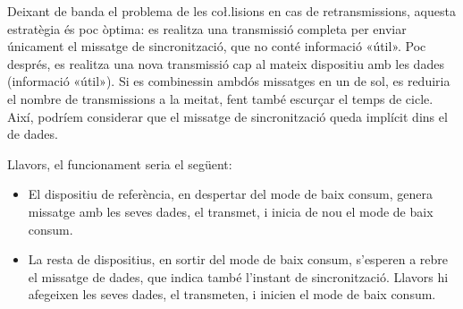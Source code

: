 \documentclass{tfgitic}[2024/07/01]
\begin{document}
{Deixant de banda el problema de les co\l.lisions en cas de retransmissions, aquesta estratègia és poc òptima: es realitza una transmissió completa per enviar únicament el missatge de sincronització, que no conté informació «útil». Poc després, es realitza una nova transmissió cap al mateix dispositiu amb les dades (informació «útil»). Si es combinessin ambdós missatges en un de sol, es reduiria el nombre de transmissions a la meitat, fent també escurçar el temps de cicle. Així, podríem considerar que el missatge de sincronització queda implícit dins el de dades.

Llavors, el funcionament seria el següent:
\begin{itemize}
    \item El dispositiu de referència, en despertar del mode de baix consum, genera missatge amb les seves dades, el transmet, i inicia de nou el mode de baix consum.
    \item La resta de dispositius, en sortir del mode de baix consum, s'esperen a rebre el missatge de dades, que indica també l'instant de sincronització. Llavors hi afegeixen les seves dades, el transmeten, i inicien el mode de baix consum.
\end{itemize}

}
\end{document}

